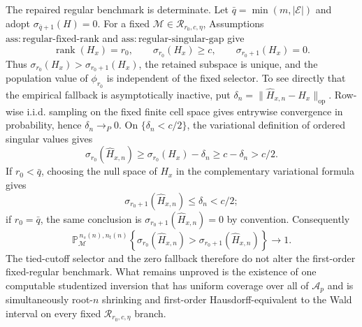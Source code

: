The repaired regular benchmark is determinate. Let \(\bar q=\min(m,\lvert\mathcal E\rvert)\) and adopt \(\sigma_{\bar q+1}(H)=0\). For a fixed \(\mathcal M\in\mathcal R_{r_0,c,\eta}\), Assumptions~\(\mathrm{ass{:}regular\text{-}fixed\text{-}rank}\) and \(\mathrm{ass{:}regular\text{-}singular\text{-}gap}\) give
\[
\operatorname{rank}(H_x)=r_0,
\qquad
\sigma_{r_0}(H_x)\ge c,
\qquad
\sigma_{r_0+1}(H_x)=0.
\]
Thus \(\sigma_{r_0}(H_x)>\sigma_{r_0+1}(H_x)\), the retained subspace is unique, and the population value of \(\phi_{r_0}\) is independent of the fixed selector. To see directly that the empirical fallback is asymptotically inactive, put \(\delta_n=\lVert\widehat H_{x,n}-H_x\rVert_{\mathrm{op}}\). Row-wise i.i.d. sampling on the fixed finite cell space gives entrywise convergence in probability, hence \(\delta_n\to_P0\). On \(\{\delta_n<c/2\}\), the variational definition of ordered singular values gives
\[
\sigma_{r_0}(\widehat H_{x,n})
\ge \sigma_{r_0}(H_x)-\delta_n
\ge c-\delta_n>c/2.
\]
If \(r_0<\bar q\), choosing the null space of \(H_x\) in the complementary variational formula gives
\[
\sigma_{r_0+1}(\widehat H_{x,n})\le\delta_n<c/2;
\]
if \(r_0=\bar q\), the same conclusion is \(\sigma_{r_0+1}(\widehat H_{x,n})=0\) by convention. Consequently
\[
\mathbb P_{\mathcal M}^{\,n_s(n),n_t(n)}
\left\{\sigma_{r_0}(\widehat H_{x,n})>
\sigma_{r_0+1}(\widehat H_{x,n})\right\}\longrightarrow1.
\]
The tied-cutoff selector and the zero fallback therefore do not alter the first-order fixed-regular benchmark. What remains unproved is the existence of one computable studentized inversion that has uniform coverage over all of \(\mathcal A_p\) and is simultaneously root-\(n\) shrinking and first-order Hausdorff-equivalent to the Wald interval on every fixed \(\mathcal R_{r_0,c,\eta}\) branch.